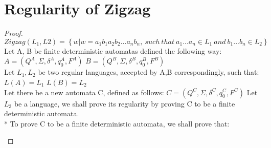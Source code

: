 \documentclass{article}
\begin{document}
\section{Regularity of Zigzag}
\begin{proof}
$Zigzag (L_1,L2) = \left\{ w|w=a_1b_1a_2b_2...a_nb_n,\: such\: that \:a_1...a_n \in L_1\:and \:  b_1...b_n \in L_2  \right\}$ \newline
\\
Let A, B be finite deterministic automatas defined the following way: \newline
$A = (Q^{A}, \Sigma, \delta^{A}, q_0^{A}, F^{A})$ \newline
$B = (Q^{B}, \Sigma, \delta^{B}, q_0^{B}, F^{B})$ \newline
\\
Let $L_1, L_2$ be two regular languages, accepted by A,B correspondingly, such that: \newline
$L(A) = L_1$ \newline
$L(B) = L_2$ \newline
\\
Let there be a new automata C, defined as follows: \newline
$C = (Q^{C}, \Sigma, \delta^{C}, q_0^{C}, F^{C})$ \newline
Let $L_3$ be a language, we shall prove its regularity by proving C to be a finite deterministic automata. \newline
\\*
To prove C to be a finite deterministic automata, we shall prove that: \newline
\begin{itemize}


\end{itemize}
\end{proof}
\end{document}
